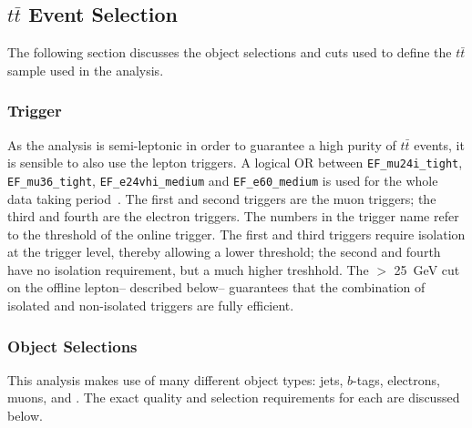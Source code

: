 \subsection{$t\bar{t}$ Event Selection}

The following section discusses the object selections and cuts used to define the $t\bar{t}$ sample used in the analysis.

\subsubsection{Trigger}

As the analysis is semi-leptonic in order to guarantee a high purity of $t\bar{t}$ events, it is sensible to also use the lepton triggers. A logical OR between {\tt EF\_mu24i\_tight}, {\tt EF\_mu36\_tight}, {\tt EF\_e24vhi\_medium} and {\tt EF\_e60\_medium} is used for the whole data taking period~\cite{ATLAS-CONF-2012-099,Pasztor:1706278}. The first and second triggers are the muon triggers; the third and fourth are the electron triggers. The numbers in the trigger name refer to the \pt threshold of the online trigger. The first and third triggers require isolation at the trigger level, thereby allowing a lower \pt threshold; the second and fourth have no isolation requirement, but a much higher \pt treshhold. The \pt $>$ 25~GeV cut on the offline lepton-- described below-- guarantees that the combination of isolated and non-isolated triggers are fully efficient.

\subsubsection{Object Selections}

This analysis makes use of many different object types: jets, $b$-tags, electrons, muons, and \met. The exact quality and selection requirements for each are discussed below.

